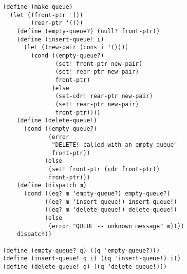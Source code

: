 \documentclass[a4paper,12pt]{article}
\begin{document}
\begin{lstlisting}
(define (make-queue)
  (let ((front-ptr '())
        (rear-ptr '()))
    (define (empty-queue?) (null? front-ptr))
    (define (insert-queue! i)
      (let ((new-pair (cons i '())))
        (cond ((empty-queue?)
               (set! front-ptr new-pair)
               (set! rear-ptr new-pair)
               front-ptr)
              (else
               (set-cdr! rear-ptr new-pair)
               (set! rear-ptr new-pair)
               front-ptr))))
    (define (delete-queue!)
      (cond ((empty-queue?)
             (error
              "DELETE! called with an empty queue"
              front-ptr))
            (else
             (set! front-ptr (cdr front-ptr))
             front-ptr)))
    (define (dispatch m)
      (cond ((eq? m 'empty-queue?) empty-queue?)
            ((eq? m 'insert-queue!) insert-queue!)
            ((eq? m 'delete-queue!) delete-queue!)
            (else
             (error "QUEUE -- unknown message" m))))
    dispatch))

(define (empty-queue? q) ((q 'empty-queue?)))
(define (insert-queue! q i) ((q 'insert-queue!) i))
(define (delete-queue! q) ((q 'delete-queue!)))
\end{lstlisting}
\end{document}
